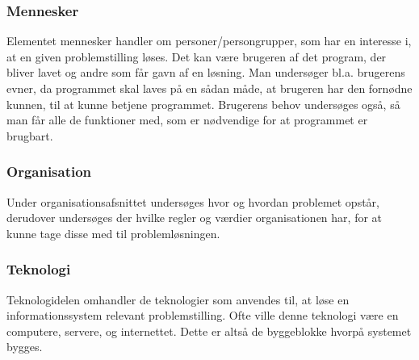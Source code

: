 \subsubsection{Mennesker}\label{subsubsec:mennesker}

Elementet mennesker handler om personer/persongrupper, som har en interesse i, at en given problemstilling
løses. Det kan være brugeren af det program, der bliver lavet og andre som får gavn af en løsning. Man
undersøger bl.a. brugerens evner, da programmet skal laves på en sådan måde, at brugeren har den
fornødne kunnen, til at kunne betjene programmet. Brugerens behov undersøges også, så man får alle de funktioner
med, som er nødvendige for at programmet er brugbart.


\subsubsection{Organisation}\label{subsubsec:organisation}

Under organisationsafsnittet undersøges hvor og hvordan problemet opstår, derudover undersøges der hvilke regler
og værdier organisationen har, for at kunne tage disse med til problemløsningen.

\cbstart
\subsubsection{Teknologi}\label{subsubsec:Teknologi}

Teknologidelen omhandler de teknologier som anvendes til, at løse en informationssystem relevant problemstilling.
Ofte ville denne teknologi være en computere, servere, og internettet. Dette er altså de byggeblokke hvorpå
systemet bygges.
\cbend



